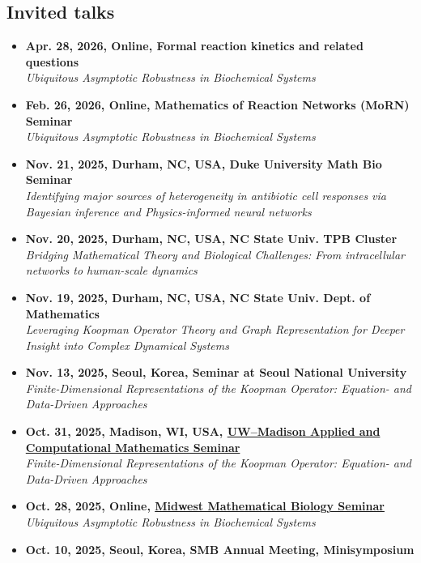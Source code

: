 \documentclass[margin,line]{res}
\begin{document}
\begin{resume}
\section{\sc Invited talks}
\begin{itemize}[leftmargin=0pt, label={}]
    \item \textbf{Apr. 28, 2026, Online, Formal reaction kinetics and related questions} \\
    \textit{Ubiquitous Asymptotic Robustness in Biochemical Systems}
    \item \textbf{Feb. 26, 2026, Online, Mathematics of Reaction Networks (MoRN) Seminar} \\
    \textit{Ubiquitous Asymptotic Robustness in Biochemical Systems}
    \item \textbf{Nov. 21, 2025, Durham, NC, USA, Duke University Math Bio Seminar} \\
    \textit{Identifying major sources of heterogeneity in antibiotic cell responses via Bayesian inference and Physics-informed neural networks}
    \item \textbf{Nov. 20, 2025, Durham, NC, USA, NC State Univ. TPB Cluster} \\
    \textit{Bridging Mathematical Theory and Biological Challenges: From intracellular networks to human-scale dynamics}
    \item \textbf{Nov. 19, 2025, Durham, NC, USA, NC State Univ. Dept. of Mathematics} \\
    \textit{Leveraging Koopman Operator Theory and Graph Representation for Deeper Insight into Complex Dynamical Systems}
    \item \textbf{Nov. 13, 2025, Seoul, Korea, Seminar at Seoul National University} \\
    \textit{Finite-Dimensional Representations of the Koopman Operator: Equation- and Data-Driven Approaches}
    \item \textbf{Oct. 31, 2025, Madison, WI, USA, \href{https://wiki.math.wisc.edu/index.php/Applied/ACMS}{UW–Madison Applied and Computational Mathematics Seminar}} \\
    \textit{Finite-Dimensional Representations of the Koopman Operator: Equation- and Data-Driven Approaches}
    \item \textbf{Oct. 28, 2025, Online, \href{https://sites.google.com/view/midwest-mathbio-seminar/home}{Midwest Mathematical Biology Seminar}} \\
    \textit{Ubiquitous Asymptotic Robustness in Biochemical Systems}
    \item \textbf{Oct. 10, 2025, Seoul, Korea, SMB Annual Meeting, Minisymposium} \\

\end{itemize}
\end{resume}
\end{document}
